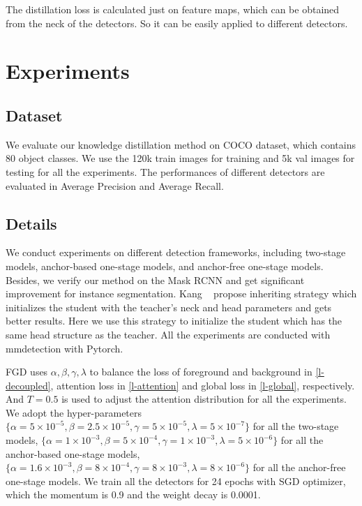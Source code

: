 \documentclass[10pt,twocolumn,letterpaper]{article}
\begin{document}
The distillation loss is calculated just on feature maps, which can be obtained from the neck of the detectors. So it can be easily applied to different detectors.

\section{Experiments}
\label{sec:experiments}
\subsection{Dataset}
We evaluate our knowledge distillation method on COCO dataset\cite{lin2014microsoft}, which contains 80 object classes. We use the 120k train images for training and 5k val images for testing for all the experiments. The performances of different detectors are evaluated in Average Precision and Average Recall.

\subsection{Details}
We conduct experiments on different detection frameworks, including two-stage models\cite{ren2015faster}, anchor-based one-stage models\cite{lin2017focal}, and anchor-free one-stage models\cite{yang2019reppoints,tian2019fcos}. Besides, we verify our method on the Mask RCNN\cite{he2017mask} and get significant improvement for instance segmentation. Kang \etal~\cite{kang2021instance} propose inheriting strategy which initializes the student with the teacher's neck and head parameters and gets better results. Here we use this strategy to initialize the student which has the same head structure as the teacher. All the experiments are conducted with mmdetection\cite{mmdetection} with Pytorch\cite{paszke2019pytorch}.

FGD uses $\alpha, \beta, \gamma, \lambda$ to balance the loss of foreground and background in \cref{l-decoupled}, attention loss in \cref{l-attention} and global loss in \cref{l-global}, respectively. And $T=0.5$ is used to adjust the attention distribution for all the experiments. We adopt the hyper-parameters$\{\alpha = 5 \times 10^{-5}, \beta=2.5\times10^{-5}, \gamma=5\times10^{-5}, \lambda=5\times10^{-7}\}$ for all the two-stage models, $\{\alpha = 1 \times 10^{-3}, \beta=5\times10^{-4}, \gamma=1\times10^{-3}, \lambda=5\times10^{-6}\}$ for all the anchor-based one-stage models, $\{\alpha = 1.6 \times 10^{-3}, \beta=8\times10^{-4}, \gamma=8\times10^{-3}, \lambda=8\times10^{-6}\}$ for all the anchor-free one-stage models. We train all the detectors for 24 epochs with SGD optimizer, which the momentum is 0.9 and the weight decay is 0.0001.
\end{document}
